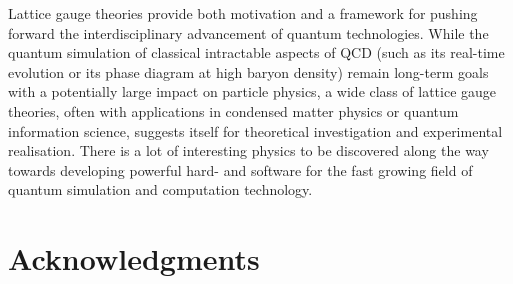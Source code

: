 \documentclass[epj,final]{svjour}
\begin{document}
Lattice gauge theories provide both motivation and a framework for pushing forward the interdisciplinary advancement of quantum technologies. While the quantum simulation of classical intractable aspects of QCD (such as its real-time evolution or its phase diagram at high baryon density) remain long-term goals with a potentially large impact on particle physics, a wide class of lattice gauge theories, often with applications in condensed matter physics or quantum information science, suggests itself for theoretical investigation and experimental realisation. There is a lot of interesting physics to be discovered along the way towards developing powerful hard- and software for the fast growing field of quantum simulation and computation technology.

\section{Acknowledgments}
\end{document}
